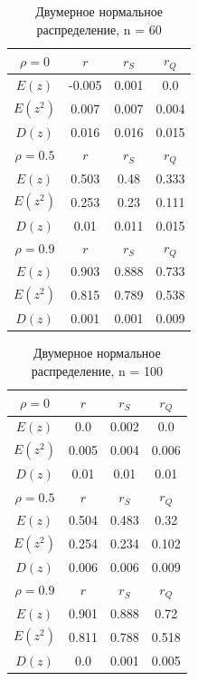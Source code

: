 \documentclass[a4paper]{article}
\begin{document}
	
	\begin{table}[H]
		\centering
		\begin{tabular}{| c | c | c | c |}
			
			\hline
			$\rho = 0$ & $r$      & $r_S$  & $r_Q$ \\
			\hline
			$E(z)$    & -0.005 & 0.001 & 0.0   \\
                $E(z^{2}) $  & 0.007  & 0.007 & 0.004 \\
                $D(z)$    & 0.016  & 0.016 & 0.015 \\
			\hline
			$\rho = 0.5$ & $r$      & $r_S$  & $r_Q$ \\
			\hline
			$E(z)$      & 0.503 & 0.48  & 0.333 \\
                $E(z^{2}) $    & 0.253 & 0.23  & 0.111 \\
                $D(z)$      & 0.01  & 0.011 & 0.015 \\
			\hline
			$\rho = 0.9$ & $r$      & $r_S$  & $r_Q$ \\
			\hline
			$E(z)$      & 0.903 & 0.888 & 0.733 \\
                $E(z^{2}) $    & 0.815 & 0.789 & 0.538 \\
                $D(z)$      & 0.001 & 0.001 & 0.009 \\
			\hline
			
		\end{tabular}{}
		\caption{Двумерное нормальное распределение, n = 60}
		\label{tab:n60}
	\end{table}
	
	
	
	\begin{table}[H]
		\centering
		\begin{tabular}{| c | c | c | c |}
			
			\hline
			$\rho = 0$ & $r$      & $r_S$  & $r_Q$ \\
			\hline
			$E(z)$    & 0.0   & 0.002 & 0.0   \\
                 $E(z^{2}) $  & 0.005 & 0.004 & 0.006 \\
                 $D(z)$    & 0.01  & 0.01  & 0.01  \\
			\hline
			$\rho = 0.5$ & $r$      & $r_S$  & $r_Q$ \\
			\hline
			$E(z)$      & 0.504 & 0.483 & 0.32  \\
                 $E(z^{2}) $    & 0.254 & 0.234 & 0.102 \\
                 $D(z)$      & 0.006 & 0.006 & 0.009 \\
			\hline
			$\rho = 0.9$ & $r$      & $r_S$  & $r_Q$ \\
			\hline
			$E(z)$      & 0.901 & 0.888 & 0.72  \\
                 $E(z^{2}) $    & 0.811 & 0.788 & 0.518 \\
                 $D(z)$      & 0.0   & 0.001 & 0.005 \\
			\hline
			
		\end{tabular}{}
		\caption{Двумерное нормальное распределение, n = 100}
		\label{tab:n100}
	\end{table}
	
\end{document}
